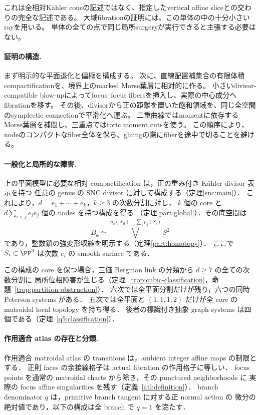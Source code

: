 これは全相対Kähler coneの記述ではなく、指定したvertical affine sliceとの交わりの完全な記述である。
大域fibrationの証明には、この単体の中の十分小さいrayを用いる。
単体の全ての点で同じ局所surgeryが実行できると主張する必要はない。

\paragraph{証明の構造.}
まず明示的な平面退化と偏極を構成する。
次に、直線配置補集合の有限体積compactificationを、境界上のmarked Morse葉層に相対的に作る。
小さいdivisor-compatible blow-upによってfocus--focus fibersを挿入し、実際の中心成分へfibrationを移す。
その後、divisorから正の距離を置いた飽和領域を、同じ全空間のsymplectic connectionで平滑化へ運ぶ。
二重曲線ではmomentに依存するMorse葉層を補間し、三重点ではtoric moment cutsを使う。
この順序により、nodeのコンパクトなfiber全体を保ち、gluingの際にfiberを途中で切ることを避ける。

\paragraph{一般化と局所的な障害.}
上の平面模型に必要な相対 compactification は，正の重み付き Kähler divisor 表示を持つ
任意の genus の SNC divisor に対して構成する（定理\ref{snc:main}）．
これにより，$d=e_1+\cdots+e_k$，$k\geq3$ の次数分割に対し，
$k$ 個の core と $d\sum_{i<j}e_i e_j$ 個の nodes を持つ構成を得る
（定理\ref{part:global}）．その底空間は
\[
 B_{\boldsymbol e}\simeq
 \bigvee^{\,p_g(X_d)-\sum_i p_g(S_i)}S^2
\]
であり，整数鎖の強変形収縮を明示する（定理\ref{part:homotopy}）．
ここで $S_i\subset\PP^3$ は次数 $e_i$ の smooth surface である．

この構成の core を保つ場合，三価 Bergman link の分類から $d\geq7$ の全ての次数分割に
局所位相障害が生じる（定理~\ref{trop:cubic-classification}，命題~\ref{trop:partition-obstruction}）．
六次では全平面分割だけが残り，六つの同時 Petersen systems がある．
五次では全平面と $(1,1,1,2)$ だけが全 core の matroidal local topology を持ち得る．
後者の標識付き抽象 graph systems は四個である（定理~\ref{q5:classification}）．

\paragraph{作用適合 atlas の存在と分類.}
作用適合 matroidal atlas の transitions は，ambient integer affine maps の制限とする．
正則 faces の余接線格子は actual fibration の作用格子に等しい．
focus points を通常の matroidal charts から除き，その punctured neighborhoods に
実際の focus affine singularities を残す（定義~\ref{atl:definition}）．
branch denominator $q$ は，primitive branch tangent に対する正 normal action の
微分の絶対値であり，以下の構成は全 branch で $q=1$ を満たす．

